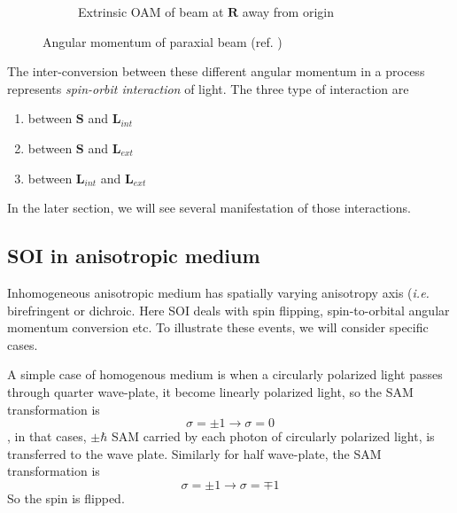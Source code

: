 \documentclass[11pt,a4paper]{article}
\numberwithin{equation}{section}
\begin{document}
\begin{figure}[H]
\begin{subfigure}[H]{0.31\textwidth}
		\caption{Extrinsic OAM of beam at $\boldsymbol{R}$ away from origin}
		\label{fig:eoam}
	\end{subfigure}
	\caption{Angular momentum of paraxial beam (ref. \cite{bliokh 15})}
	\label{fig:am}
\end{figure}

The inter-conversion between these different angular momentum in a process represents \textit{spin-orbit interaction} of light.\cite{bliokh 15} The three type of interaction  are
\begin{enumerate}
	\item between $\boldsymbol{S}$ and $\boldsymbol{L}_{int}$
	\item between $\boldsymbol{S}$ and $\boldsymbol{L}_{ext}$
	\item between $\boldsymbol{L}_{int}$ and $\boldsymbol{L}_{ext}$
\end{enumerate}
In the later section, we will see several manifestation of those interactions.


\subsection{SOI in anisotropic medium}
Inhomogeneous anisotropic medium has spatially varying anisotropy axis (\textit{i.e.} birefringent or dichroic. Here SOI deals with spin flipping, spin-to-orbital angular momentum conversion etc. To illustrate these events, we will consider specific cases.

A simple case of homogenous medium is when a circularly polarized light passes through quarter wave-plate, it become linearly polarized light, so the SAM transformation is $$\sigma=\pm1 \longrightarrow \sigma= 0$$, in that cases, $\pm\hbar$ SAM carried by each photon of circularly polarized light, is transferred to the wave plate. Similarly for half wave-plate, the SAM transformation is 
$$\sigma=\pm 1 \longrightarrow \sigma=\mp1$$ So the spin is flipped.
\end{document}
